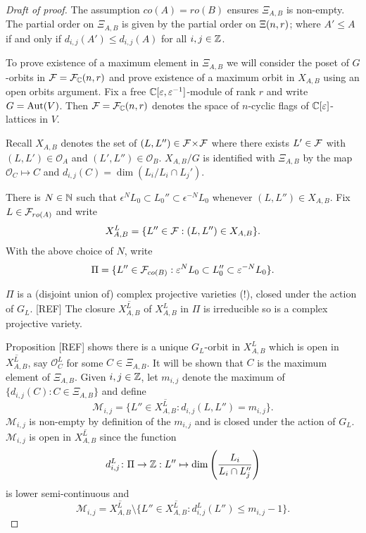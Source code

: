 \documentclass[a4paper, 11pt]{report}
\begin{document}
\begin{proof}[Draft of proof]
The assumption $co(A)=ro(B)$ ensures $\Xi_{A,B}$ is non-empty. The partial order on $\Xi_{A,B}$ is given by the partial order on $\Xi(n,r)$; where $A'\le A$ if and only if $d_{i,j}(A')\le d_{i,j}(A)$ for all $i,j\in\mathbb{Z}$.

To prove existence of a maximum element in $\Xi_{A,B}$ we will consider the poset of $G$-orbits in $\mathcal{F}=\mathcal{F}_{\mathbb{C}}(n,r)$ and prove existence of a maximum orbit in $X_{A,B}$ using an open orbits argument. Fix a free $\mathbb{C}[\varepsilon,\varepsilon^{-1}]$-module of rank $r$ and write $G=\operatorname{Aut}(V)$. Then $\mathcal{F} = \mathcal{F}_{\mathbb{C}}(n,r)$ denotes the space of $n$-cyclic flags of $\mathbb{C}[\varepsilon]$-lattices in $V$.

Recall $X_{A,B}$ denotes the set of $(L,L'')\in{\mathcal{F}\!\times\!\mathcal{F}}$ where there exists $L'\in\mathcal{F}$ with $(L,L')\in\mathcal{O}_A$ and $(L',L'')\in\mathcal{O}_B$. $X_{A,B}/G$ is identified with $\Xi_{A,B}$ by the map $\mathcal{O}_C\mapsto C$ and $d_{i,j}(C) = \dim(L_i/{L_i\cap L_j'})$.

There is $N\in\mathbb{N}$ such that $\epsilon^N L_0\subset L_0''\subset \epsilon^{-N}L_0$ whenever $(L,L'')\in X_{A,B}$. Fix $L\in\mathcal{F}_{ro(A)}$ and write
\begin{equation*}
X_{A,B}^L = \{L''\in\mathcal{F}: (L,L'')\in X_{A,B}\}.
\end{equation*}
With the above choice of $N$, write
\begin{equation*}
\Pi = \{L''\in\mathcal{F}_{co(B)}: \varepsilon^N L_0\subset L_0''\subset \varepsilon^{-N} L_0\}.
\end{equation*}

$\Pi$ is a (disjoint union of) complex projective varieties (!), closed under the action of $G_L$. [REF] The closure $\overline{X_{A,B}^L}$ of $X_{A,B}^L$ in $\Pi$ is irreducible so is a complex projective variety.

Proposition [REF] shows there is a unique $G_L$-orbit in $X_{A,B}^L$ which is open in $\overline{X_{A,B}^L}$, say $\mathcal{O}_C^L$ for some $C\in\Xi_{A,B}$. It will be shown that $C$ is the maximum element of $\Xi_{A,B}$. Given $i,j\in\mathbb{Z}$, let $m_{i,j}$ denote the maximum of $\{d_{i,j}(C): C\in\Xi_{A,B}\}$ and define
\begin{equation*}
\mathcal{M}_{i,j} = \{L''\in \overline{X_{A,B}^L}: d_{i,j}(L,L'') = m_{i,j}\}.
\end{equation*}
$\mathcal{M}_{i,j}$ is non-empty by definition of the $m_{i,j}$ and is closed under the action of $G_L$. $\mathcal{M}_{i,j}$ is open in $\overline{X_{A,B}^L}$ since the function
\begin{equation*}
d_{i,j}^L\colon\Pi\to\mathbb{Z}: L''\mapsto \dim\left(\frac{L_i}{L_i\cap L_j''}\right)
\end{equation*}
is lower semi-continuous and
\begin{equation*}
\mathcal{M}_{i,j} = \overline{X_{A,B}^L}\setminus \{L''\in\overline{X_{A,B}^L}: d_{i,j}^L(L'')\le m_{i,j} -1\}.
\end{equation*}


\end{proof}
\end{document}
